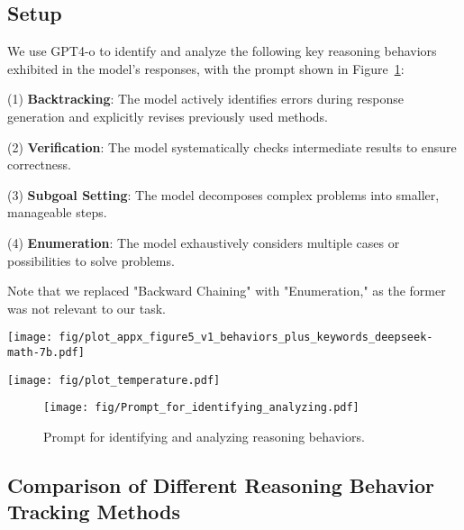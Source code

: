 \subsection{Setup}
\label{sec:bahaviour_setup}
We use GPT4-o to  identify and analyze the following key reasoning behaviors exhibited in the model's responses, with the prompt shown in Figure~\ref{fig:prompt_reasoning_behaviors}:

(1) \textbf{Backtracking}: The model actively identifies errors during response generation and explicitly revises previously used methods.

(2) \textbf{Verification}: The model systematically checks intermediate results to ensure correctness.

(3) \textbf{Subgoal Setting}: The model decomposes complex problems into smaller, manageable steps.

(4) \textbf{Enumeration}: The model exhaustively considers multiple cases or possibilities to solve problems.

Note that we replaced "Backward Chaining" with "Enumeration," as the former was not relevant to our task.

\begin{figure*}[!t]
    \centering
    \begin{minipage}{0.50\textwidth}
        \centering
        \texttt{[image: fig/plot\_appx\_figure5\_v1\_behaviors\_plus\_keywords\_deepseek-math-7b.pdf]}
        \caption{Changes in reflection behavior identified by different methods.}
        \label{fig:method_reasoning_behaviors}
    \end{minipage}
    \hfill
    \begin{minipage}{0.40\textwidth}
        \centering
        \texttt{[image: fig/plot\_temperature.pdf]}
        \caption{Impact of training and evaluation temperatures on Qwen-2.5-0.5b's average final performance (x-axis: evaluation temp, y-axis: training temp).}
        \label{fig:train_sample_temperature}
    \end{minipage}
\end{figure*}

\begin{figure}[!t]
        \centering
\texttt{[image: fig/Prompt\_for\_identifying\_analyzing.pdf]}
\caption{Prompt for identifying and analyzing reasoning behaviors.
        }
        \label{fig:prompt_reasoning_behaviors}
\end{figure}

\subsection{Comparison of Different Reasoning Behavior Tracking Methods}


